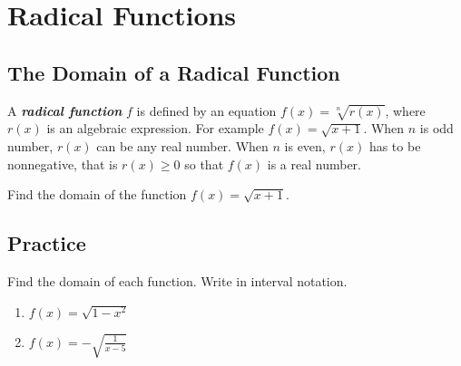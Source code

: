 
\hypertarget{radical-functions}{%
\section{Radical Functions}\label{radical-functions}}

\hypertarget{the-domain-of-a-radical-function}{%
\subsection{The Domain of a Radical
Function}\label{the-domain-of-a-radical-function}}

A \textbf{\emph{radical function}} \(f\) is defined by an equation
\(f(x)=\sqrt[n]{r(x)}\), where \(r(x)\) is an algebraic expression. For
example \(f(x)=\sqrt{x+1}\). When \(n\) is odd number, \(r(x)\) can be
any real number. When \(n\) is even, \(r(x)\) has to be nonnegative,
that is \(r(x)\geq 0\) so that \(f(x)\) is a real number.

\begin{example}

Find the domain of the function \(f(x)=\sqrt{x+1}\).

\end{example}
\vspace*{6\baselineskip}

\subsection{Practice}

\begin{exercise}

Find the domain of each function. Write in interval notation.

\begin{enumerate}
\item
  \(f(x)=\sqrt{1-x^2}\)
\item
  \(f(x)=-\sqrt{\frac{1}{x-5}}\)
\end{enumerate}

\end{exercise}
